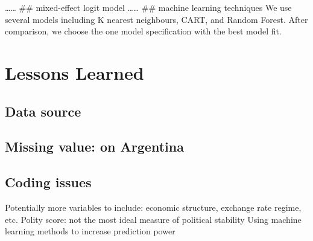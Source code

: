 \documentclass[12pt,]{article}
\begin{document}
\ldots{}\ldots{} \#\# mixed-effect logit model \ldots{}\ldots{} \#\#
machine learning techniques We use several models including K nearest
neighbours, CART, and Random Forest. After comparison, we choose the one
model specification with the best model fit.

\section{Lessons Learned}\label{lessons-learned}

\subsection{Data source}\label{data-source-1}

\subsection{Missing value: on
Argentina}\label{missing-value-on-argentina}

\subsection{Coding issues}\label{coding-issues}

Potentially more variables to include: economic structure, exchange rate
regime, etc. Polity score: not the most ideal measure of political
stability Using machine learning methods to increase prediction power
\end{document}
